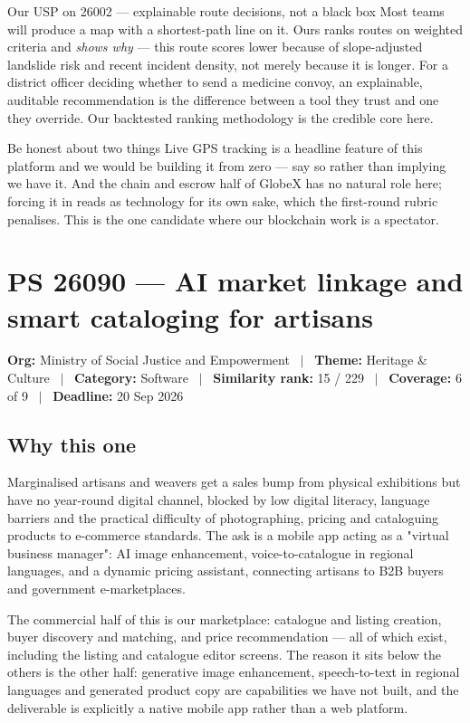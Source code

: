 \documentclass[11pt]{article}
\newcommand{\psbanner}[6]{%
  \vspace{0.2em}
  {\footnotesize\color{gxslate}\textbf{Org:} #1 \ $\vert$ \ \textbf{Theme:} #2 \ $\vert$ \ \textbf{Category:} #3 \ $\vert$ \ \textbf{Similarity rank:} #4 \ $\vert$ \ \textbf{Coverage:} #5 \ $\vert$ \ \textbf{Deadline:} #6}
  \par\vspace{0.6em}
}
\begin{document}
\begin{uspbox}{Our USP on 26002 --- explainable route decisions, not a black box}
Most teams will produce a map with a shortest-path line on it. Ours ranks routes on weighted criteria and
\emph{shows why} --- this route scores lower because of slope-adjusted landslide risk and recent incident
density, not merely because it is longer. For a district officer deciding whether to send a medicine
convoy, an explainable, auditable recommendation is the difference between a tool they trust and one they
override. Our backtested ranking methodology is the credible core here.
\end{uspbox}

\begin{warnbox}{Be honest about two things}
Live GPS tracking is a headline feature of this platform and we would be building it from zero --- say so
rather than implying we have it. And the chain and escrow half of GlobeX has no natural role here; forcing
it in reads as technology for its own sake, which the first-round rubric penalises. This is the one
candidate where our blockchain work is a spectator.
\end{warnbox}

\clearpage
\section{PS 26090 --- AI market linkage and smart cataloging for artisans}
\psbanner{Ministry of Social Justice and Empowerment}{Heritage \& Culture}{Software}{15 / 229}{6 of 9}{20 Sep 2026}

\subsection*{Why this one}
Marginalised artisans and weavers get a sales bump from physical exhibitions but have no year-round
digital channel, blocked by low digital literacy, language barriers and the practical difficulty of
photographing, pricing and cataloguing products to e-commerce standards. The ask is a mobile app acting as
a "virtual business manager": AI image enhancement, voice-to-catalogue in regional languages, and a
dynamic pricing assistant, connecting artisans to B2B buyers and government e-marketplaces.

The commercial half of this is our marketplace: catalogue and listing creation, buyer discovery and
matching, and price recommendation --- all of which exist, including the listing and catalogue editor
screens. The reason it sits below the others is the other half: generative image enhancement,
speech-to-text in regional languages and generated product copy are capabilities we have not built, and
the deliverable is explicitly a native mobile app rather than a web platform.
\end{document}
